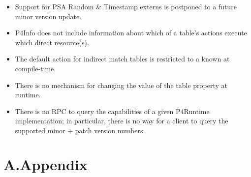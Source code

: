 \documentclass[11pt]{article}
\begin{document}
{\begin{itemize}
\begin{itemize}[noitemsep,topsep=\mdcompacttopsep]
\item{}a  or  with an underlying type that is one of the above (or
in general a \textquotedblleft{}chain\textquotedblright{} of  and/or  that eventually ends with
one of the types above)%
\end{itemize}%

\item{}
Support for PSA Random \& Timestamp externs is postponed to a future minor
version update.%

\item{}
P4Info does not include information about which of a table's actions execute
which direct resource(s).%

\item{}
The default action for indirect match tables is restricted to a  known at compile-time.%

\item{}
There is no mechanism for changing the value of the 
table property at runtime.%

\item{}
There is no RPC to query the capabilities of a given P4Runtime implementation;
in particular, there is no way for a client to query the supported minor +
patch version numbers.%
\end{itemize}%

\section{A.\hspace*{0.5em}Appendix}\label{sec-appendix}%

}
\end{document}
